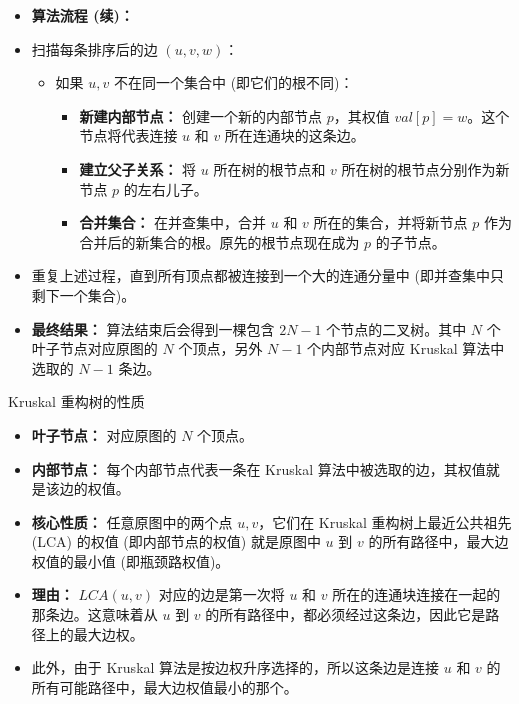 \documentclass[11pt]{beamer}
\begin{document}
\begin{frame}
    \begin{itemize}
        \item \textbf{算法流程 (续)：}
            \item 扫描每条排序后的边 $(u, v, w)$：
            \begin{itemize}
                \item 如果 $u, v$ 不在同一个集合中 (即它们的根不同)：
                \begin{itemize}
                    \item \textbf{新建内部节点：} 创建一个新的内部节点 $p$，其权值 $val[p] = w$。这个节点将代表连接 $u$ 和 $v$ 所在连通块的这条边。
                    \item \textbf{建立父子关系：} 将 $u$ 所在树的根节点和 $v$ 所在树的根节点分别作为新节点 $p$ 的左右儿子。
                    \item \textbf{合并集合：} 在并查集中，合并 $u$ 和 $v$ 所在的集合，并将新节点 $p$ 作为合并后的新集合的根。原先的根节点现在成为 $p$ 的子节点。
                \end{itemize}
            \end{itemize}
            \item 重复上述过程，直到所有顶点都被连接到一个大的连通分量中 (即并查集中只剩下一个集合)。
        
        \item \textbf{最终结果：} 算法结束后会得到一棵包含 $2N-1$ 个节点的二叉树。其中 $N$ 个叶子节点对应原图的 $N$ 个顶点，另外 $N-1$ 个内部节点对应 Kruskal 算法中选取的 $N-1$ 条边。
    \end{itemize}
\end{frame}

\begin{frame}{Kruskal 重构树的性质}
    \begin{itemize}
        \item \textbf{叶子节点：} 对应原图的 $N$ 个顶点。
        \item \textbf{内部节点：} 每个内部节点代表一条在 Kruskal 算法中被选取的边，其权值就是该边的权值。
        \item \textbf{核心性质：} 任意原图中的两个点 $u, v$，它们在 Kruskal 重构树上最近公共祖先 (LCA) 的权值 (即内部节点的权值) 就是原图中 $u$ 到 $v$ 的所有路径中，最大边权值的最小值 (即瓶颈路权值)。
        \item \textbf{理由：} $LCA(u, v)$ 对应的边是第一次将 $u$ 和 $v$ 所在的连通块连接在一起的那条边。这意味着从 $u$ 到 $v$ 的所有路径中，都必须经过这条边，因此它是路径上的最大边权。
        \item 此外，由于 Kruskal 算法是按边权升序选择的，所以这条边是连接 $u$ 和 $v$ 的所有可能路径中，最大边权值最小的那个。
    \end{itemize}
\end{frame}
\end{document}
